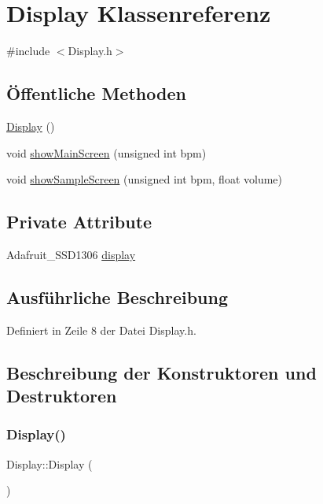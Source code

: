 \hypertarget{class_display}{}\section{Display Klassenreferenz}
\label{class_display}


{\ttfamily \#include $<$Display.\+h$>$}

\subsection*{Öffentliche Methoden}
\begin{DoxyCompactItemize}
\item 
\hyperlink{class_display_ae972fffea6f7ca1d627ef48c3d841bb3}{Display} ()
\item 
void \hyperlink{class_display_a1a47a3c1e96d0ade385063c87197182f}{show\+Main\+Screen} (unsigned int bpm)
\item 
void \hyperlink{class_display_a74eafd254fbd1f6757ea77501b2b4d04}{show\+Sample\+Screen} (unsigned int bpm, float volume)
\end{DoxyCompactItemize}
\subsection*{Private Attribute}
\begin{DoxyCompactItemize}
\item 
Adafruit\+\_\+\+S\+S\+D1306 \hyperlink{class_display_ad8b8ca65d118eb16461932c6630463a1}{display}
\end{DoxyCompactItemize}


\subsection{Ausführliche Beschreibung}


Definiert in Zeile 8 der Datei Display.\+h.



\subsection{Beschreibung der Konstruktoren und Destruktoren}
\mbox{\label{class_display_ae972fffea6f7ca1d627ef48c3d841bb3}} 
\subsubsection{\texorpdfstring{Display()}{Display()}}
{\footnotesize\ttfamily Display\+::\+Display (\begin{DoxyParamCaption}{ }\end{DoxyParamCaption})}



